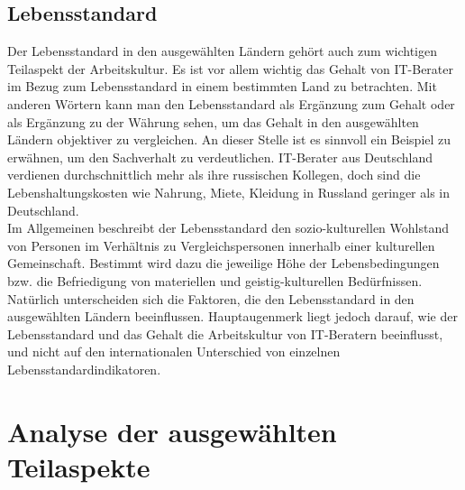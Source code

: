 \subsection*{Lebensstandard}
Der Lebensstandard in den ausgewählten Ländern gehört auch zum wichtigen Teilaspekt der Arbeitskultur. Es ist vor allem wichtig das Gehalt von IT-Berater im Bezug zum Lebensstandard in einem bestimmten Land zu betrachten. Mit anderen Wörtern kann man den Lebensstandard als Ergänzung zum Gehalt oder als Ergänzung zu der Währung sehen, um das Gehalt in den ausgewählten Ländern objektiver zu vergleichen. An dieser Stelle ist es sinnvoll ein Beispiel zu erwähnen, um den Sachverhalt zu verdeutlichen. IT-Berater aus Deutschland verdienen durchschnittlich mehr als ihre russischen Kollegen, doch sind die Lebenshaltungskosten wie Nahrung, Miete, Kleidung in Russland geringer als in Deutschland.\\
Im Allgemeinen beschreibt der Lebensstandard den sozio-kulturellen Wohlstand von Personen im Verhältnis zu Vergleichspersonen innerhalb einer kulturellen Gemeinschaft. Bestimmt wird dazu die jeweilige Höhe der Lebensbedingungen bzw. die Befriedigung von materiellen und geistig-kulturellen Bedürfnissen. \cite{LbsWiki} \\
Natürlich unterscheiden sich die Faktoren, die den Lebensstandard in den ausgewählten Ländern beeinflussen. Hauptaugenmerk liegt jedoch darauf, wie der Lebensstandard und das Gehalt die Arbeitskultur von IT-Beratern beeinflusst, und nicht auf den internationalen Unterschied von einzelnen Lebensstandardindikatoren.
\section{Analyse der ausgewählten Teilaspekte}
